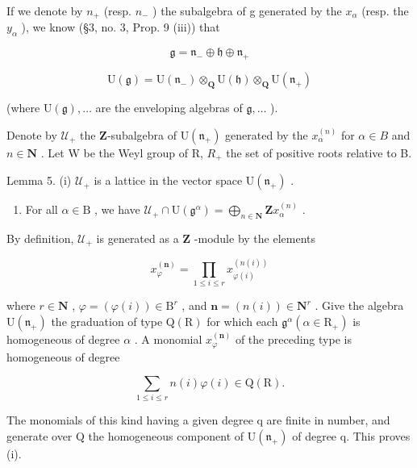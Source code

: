 If we denote by \(n_{+}\) (resp. \(n_{-}\) ) the subalgebra of g generated by the \(x_{\alpha}\) (resp. the \(y_{\alpha}\) ), we know (§3, no. 3, Prop. 9 (iii)) that

\[
\mathfrak {g} = \mathfrak {n} _ {-} \oplus \mathfrak {h} \oplus \mathfrak {n} _ {+}\tag{21}
\]

\[
\mathrm{U} (\mathfrak {g}) = \mathrm{U} (\mathfrak {n} _ {-}) \otimes_ {\mathbf {Q}} \mathrm{U} (\mathfrak {h}) \otimes_ {\mathbf {Q}} \mathrm{U} (\mathfrak {n} _ {+})\tag{22}
\]

(where \(\mathrm{U}(\mathfrak{g}),\ldots\) are the enveloping algebras of \(\mathfrak{g},\ldots\) ).

Denote by \(\mathcal{U}_{+}\) the \(\mathbf{Z}\)-subalgebra of \(\mathrm{U}(\mathfrak{n}_{+})\) generated by the \(x_{\alpha}^{(n)}\) for \(\alpha \in B\) and \(n \in \mathbf{N}\) . Let W be the Weyl group of R, \(R_{+}\) the set of positive roots relative to B.

Lemma 5. (i) \(\mathcal{U}_{+}\) is a lattice in the vector space \(\mathrm{U}(\mathfrak{n}_{+})\) .

\begin{enumerate}
\def\labelenumi{(\roman{enumi})}
\setcounter{enumi}{1}
\tightlist
\item
  For all \(\alpha \in \mathrm{B}\) , we have \(\mathcal{U}_{+} \cap \mathrm{U}(\mathfrak{g}^{\alpha}) = \bigoplus_{n \in \mathbf{N}} \mathbf{Z}x_{\alpha}^{(n)}\) .
\end{enumerate}

By definition, \(\mathcal{U}_{+}\) is generated as a \(\mathbf{Z}\) -module by the elements

\[
x _ {\varphi} ^ {(\mathbf {n})} = \prod_ {1 \leq i \leq r} x _ {\varphi (i)} ^ {(n (i))}
\]

where \(r \in \mathbf{N}\) , \(\varphi = (\varphi(i)) \in \mathrm{B}^{r}\) , and \(\mathbf{n} = (n(i)) \in \mathbf{N}^{r}\) . Give the algebra \(\mathrm{U}(\mathfrak{n}_{+})\) the graduation of type \(\mathrm{Q}(\mathrm{R})\) for which each \(\mathfrak{g}^{\alpha} (\alpha \in \mathrm{R}_{+})\) is homogeneous of degree \(\alpha\) . A monomial \(x_{\varphi}^{(\mathbf{n})}\) of the preceding type is homogeneous of degree

\[
\sum_ {1 \leq i \leq r} n (i) \varphi (i) \in \mathrm{Q} (\mathrm{R}).
\]

The monomials of this kind having a given degree q are finite in number, and generate over Q the homogeneous component of \(\mathrm{U}(\mathfrak{n}_{+})\) of degree q. This proves (i).

